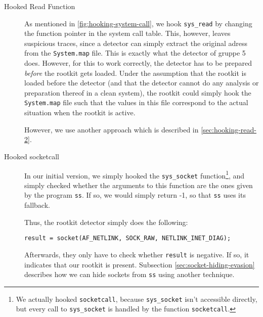 \documentclass[10pt, letterpaper]{scrartcl}
\begin{document}
\begin{description}
\item[Hooked Read Function] As mentioned in \autoref{fig:hooking-system-call}, we hook \texttt{sys\_read} by changing the function pointer in the system call table. This, however, leaves suspicious traces, since a detector can simply extract the original adress from the \texttt{System.map} file. This is exactly what the detector of gruppe 5 does. However, for this to work correctly, the detector has to be prepared \textit{before} the rootkit gets loaded. Under the assumption that the rootkit is loaded before the detector (and that the detector cannot do any analysis or preparation thereof in a clean system), the rootkit could simply hook the \texttt{System.map} file such that the values in this file correspond to the actual situation when the rootkit is active.

However, we use another approach which is described in \autoref{sec:hooking-read-2}.
\item[Hooked socketcall] In our initial version, we simply hooked the \texttt{sys\_socket} function\footnote{We actually hooked \texttt{socketcall}, because \texttt{sys\_socket} isn't accessible directly, but every call to \texttt{sys\_socket} is handled by the function \texttt{socketcall}.}, and simply checked whether the arguments to this function are the ones given by the program \texttt{ss}. If so, we would simply return -1, so that \texttt{ss} uses its fallback.

Thus, the rootkit detector simply does the following:

\begin{verbatim}
result = socket(AF_NETLINK, SOCK_RAW, NETLINK_INET_DIAG);
\end{verbatim}

Afterwards, they only have to check whether \texttt{result} is negative. If so, it indicates that our rootkit is present. Subsection \ref{sec:socket-hiding-evasion} describes how we can hide sockets from \texttt{ss} using another technique.


\end{description}
\end{document}

